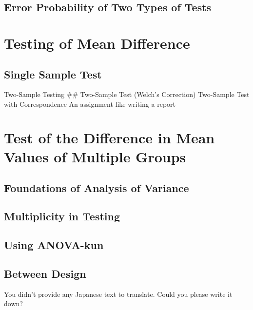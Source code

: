\documentclass[
  a4paper,
]{book}
\begin{document}
\section{Error Probability of Two Types of
Tests}\label{error-probability-of-two-types-of-tests}


\chapter{Testing of Mean Difference}\label{testing-of-mean-difference}

\section{Single Sample Test}\label{single-sample-test}

Two-Sample Testing \#\# Two-Sample Test (Welch's Correction) Two-Sample
Test with Correspondence An assignment like writing a report


\chapter{Test of the Difference in Mean Values of Multiple
Groups}\label{test-of-the-difference-in-mean-values-of-multiple-groups}

\section{Foundations of Analysis of
Variance}\label{foundations-of-analysis-of-variance}

\section{Multiplicity in Testing}\label{multiplicity-in-testing}

\section{Using ANOVA-kun}\label{using-anova-kun}

\section{Between Design}\label{between-design}

You didn't provide any Japanese text to translate. Could you please
write it down?
\end{document}

